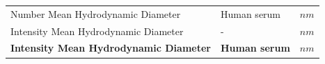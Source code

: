 \documentclass[utf8]{frontiersHLTH} %
\begin{document}
\begin{longtable}[]{@{}lll@{}}
\begin{minipage}[t]{0.58\columnwidth}\raggedright\strut
Number Mean Hydrodynamic Diameter\strut
\end{minipage} & \begin{minipage}[t]{0.20\columnwidth}\raggedright\strut
Human serum\strut
\end{minipage} & \begin{minipage}[t]{0.13\columnwidth}\raggedright\strut
\(nm\)\strut
\end{minipage}\tabularnewline
\begin{minipage}[t]{0.58\columnwidth}\raggedright\strut
Intensity Mean Hydrodynamic Diameter\strut
\end{minipage} & \begin{minipage}[t]{0.20\columnwidth}\raggedright\strut
-\strut
\end{minipage} & \begin{minipage}[t]{0.13\columnwidth}\raggedright\strut
\(nm\)\strut
\end{minipage}\tabularnewline
\begin{minipage}[t]{0.58\columnwidth}\raggedright\strut
\textbf{Intensity Mean Hydrodynamic Diameter}\strut
\end{minipage} & \begin{minipage}[t]{0.20\columnwidth}\raggedright\strut
\textbf{Human serum}\strut
\end{minipage} & \begin{minipage}[t]{0.13\columnwidth}\raggedright\strut
\(nm\)\strut
\end{minipage}\tabularnewline
\bottomrule
\end{longtable}
\end{document}
